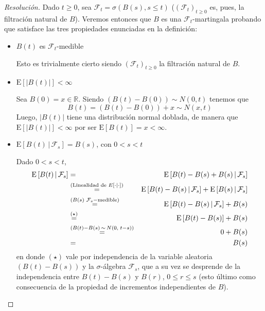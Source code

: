 \documentclass[a4paper,11pt]{article}
\newcommand{\abs}[1]{\ensuremath{\left\lvert #1 \right\rvert}}
\newcommand{\Sig}[1]{\ensuremath{\mathcal{#1}}}
\newcommand{\SigAlg}[1]{\ensuremath{\sigma\left(#1\right)}}
\newcommand{\Exp}[1]{\ensuremath{\textrm{E}\left[#1\right]}}
\newcommand{\ExpC}[2]{\ensuremath{\textrm{E}\left[#1 \, | \, #2\right]}}
\begin{document}
\begin{proof}[Resoluci\'on]
Dado $t \geq 0$, sea $\Sig{F}_t = \SigAlg{B(s), s \leq t}$ ($(\Sig{F}_t)_{t \geq 0}$ es, pues,
la filtración natural de $B$). Veremos entonces que $B$ es una $\Sig{F}_t$-martingala probando
que satisface las tres propiedades enunciadas en la definición:

\begin{itemize}
    \item $B(t)$ es $\Sig{F}_t$-medible

    Esto es trivialmente cierto siendo $(\Sig{F}_t)_{t \geq 0}$ la filtración natural de $B$.

    \item $\Exp{\abs{B(t)}} < \infty$

    Sea $B(0) = x \in \mathbb{R}$. Siendo $(B(t) - B(0)) \sim N(0,t)$ tenemos que
    $$B(t) = \left(B(t) - B(0)\right) + x \sim N(x,t)$$
    Luego, $\abs{B(t)}$ tiene una distribución normal doblada, de manera que
    $\Exp{\abs{B(t)}} < \infty$ por ser $\Exp{B(t)} = x < \infty$.

    \item $\ExpC{B(t)}{\Sig{F}_s} = B(s)$, con $0 < s < t$

    Dado $0 < s < t$, 
    \begin{eqnarray*}
        \ExpC{B(t)}{\Sig{F}_s} &=& \ExpC{B(t) - B(s) + B(s)}{\Sig{F}_s} \\
        &\overset{\tiny{(\textrm{Linealidad de } E[\cdot|\cdot])}}{=}&
            \ExpC{B(t) - B(s)}{\Sig{F}_s} + \ExpC{B(s)}{\Sig{F}_s} \\
        &\overset{\tiny{(B(s) \,\, \Sig{F}_s-\textrm{medible}})}{=}&
            \ExpC{B(t) - B(s)}{\Sig{F}_s} + B(s) \\
        &\overset{\tiny(\star)}{=}& \Exp{B(t) - B(s)} + B(s) \\
        &\overset{\tiny{(B(t)-B(s) \, \sim \, N(0,~t-s))}}{=}&
            0 + B(s) \\
        &=& B(s)
    \end{eqnarray*}
    en donde $(\star)$ vale por independencia de la variable aleatoria $(B(t) - B(s))$
    y la $\sigma$-álgebra $\Sig{F}_s$, que a su vez se desprende de la independencia
    entre $B(t)-B(s)$ y $B(r)$, $0 \leq r \leq s$ (esto último como consecuencia de la
    propiedad de incrementos independientes de $B$).
\end{itemize}
\end{proof}
\end{document}

